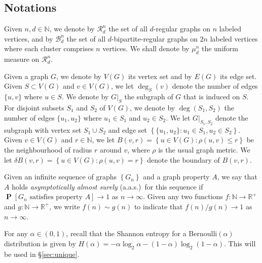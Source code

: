 \documentclass[11pt,reqno]{amsart}
\theoremstyle{definition}
\theoremstyle{remark}
\theoremstyle{conjecture}
\DeclareMathOperator{\Prob}{\mathbf{P}}
\begin{document}
\subsection{Notations}\label{notation} Given $n, d \in \mathbb{N}$, we denote by $\mathcal{R}^{n}_{d}$ the set of all $d$-regular graphs on $n$ labeled vertices, and by $\mathcal{B}^{n}_{d}$ the set of all $d$-bipartite-regular graphs on $2n$ labeled vertices where each cluster comprises $n$ vertices. We shall denote by $\mu^{n}_{d}$ the uniform measure on $\mathcal{R}^{n}_{d}$. 

Given a graph $G$, we denote by $V(G)$ its vertex set and by $E(G)$ its edge set. Given $S \subset V(G)$ and $v \in V(G)$, we let $\deg_{S}(v)$ denote the number of edges $\{u, v\}$ where $u \in S$. We denote by $G|_{S}$ the subgraph of $G$ that is induced on $S$. For disjoint subsets $S_{1}$ and $S_{2}$ of $V(G)$, we denote by $\deg(S_{1}, S_{2})$ the number of edges $\{u_{1}, u_{2}\}$ where $u_{1} \in S_{1}$ and $u_{2} \in S_{2}$. We let $G|_{S_{1}, S_{2}}$ denote the subgraph with vertex set $S_{1} \cup S_{2}$ and edge set $\left\{\{u_{1}, u_{2}\}: u_{1} \in S_{1}, u_{2} \in S_{2}\right\}$. Given $v \in V(G)$ and $r \in \mathbb{N}$, we let $B(v, r) = \left\{u \in V(G): \rho(u, v) \leqslant r\right\}$ be the neighbourhood of radius $r$ around $v$, where $\rho$ is the usual graph metric. We let $\delta B(v, r) = \left\{u \in V(G): \rho(u, v) = r\right\}$ denote the boundary of $B(v, r)$. 

Given an infinite sequence of graphs $\left\{G_{n}\right\}$ and a graph property $A$, we say that $A$ holds \emph{asymptotically almost surely} (a.a.s.)\ for this sequence if $\Prob[G_{n} \text{ satisfies property } A] \rightarrow 1$ as $n \rightarrow \infty$. Given any two functions $f: \mathbb{N} \rightarrow \mathbb{R}^{+}$ and $g: \mathbb{N} \rightarrow \mathbb{R}^{+}$, we write $f(n) \sim g(n)$ to indicate that $f(n)/g(n) \rightarrow 1$ as $n \rightarrow \infty$. 

For any $\alpha \in (0,1)$, recall that the Shannon entropy for a Bernoulli$(\alpha)$ distribution is given by $H(\alpha) = -\alpha \log_{2} \alpha - (1-\alpha) \log_{2} (1-\alpha)$. This will be used in \S\ref{sec:unique}.

\end{document}

